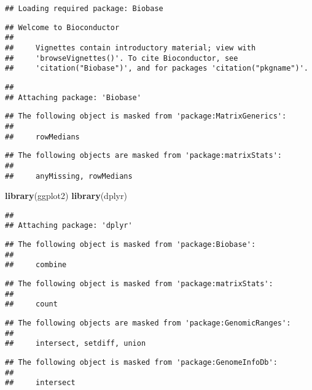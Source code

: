 \documentclass[
]{article}
\newenvironment{Shaded}{\begin{snugshade}}{\end{snugshade}}
\newcommand{\FunctionTok}[1]{\textcolor[rgb]{0.13,0.29,0.53}{\textbf{#1}}}
\newcommand{\NormalTok}[1]{#1}
\begin{document}
\begin{verbatim}
## Loading required package: Biobase
\end{verbatim}

\begin{verbatim}
## Welcome to Bioconductor
## 
##     Vignettes contain introductory material; view with
##     'browseVignettes()'. To cite Bioconductor, see
##     'citation("Biobase")', and for packages 'citation("pkgname")'.
\end{verbatim}

\begin{verbatim}
## 
## Attaching package: 'Biobase'
\end{verbatim}

\begin{verbatim}
## The following object is masked from 'package:MatrixGenerics':
## 
##     rowMedians
\end{verbatim}

\begin{verbatim}
## The following objects are masked from 'package:matrixStats':
## 
##     anyMissing, rowMedians
\end{verbatim}

\begin{Shaded}
\begin{Highlighting}[]
\FunctionTok{library}\NormalTok{(ggplot2)}
\FunctionTok{library}\NormalTok{(dplyr)}
\end{Highlighting}
\end{Shaded}

\begin{verbatim}
## 
## Attaching package: 'dplyr'
\end{verbatim}

\begin{verbatim}
## The following object is masked from 'package:Biobase':
## 
##     combine
\end{verbatim}

\begin{verbatim}
## The following object is masked from 'package:matrixStats':
## 
##     count
\end{verbatim}

\begin{verbatim}
## The following objects are masked from 'package:GenomicRanges':
## 
##     intersect, setdiff, union
\end{verbatim}

\begin{verbatim}
## The following object is masked from 'package:GenomeInfoDb':
## 
##     intersect
\end{verbatim}
\end{document}
